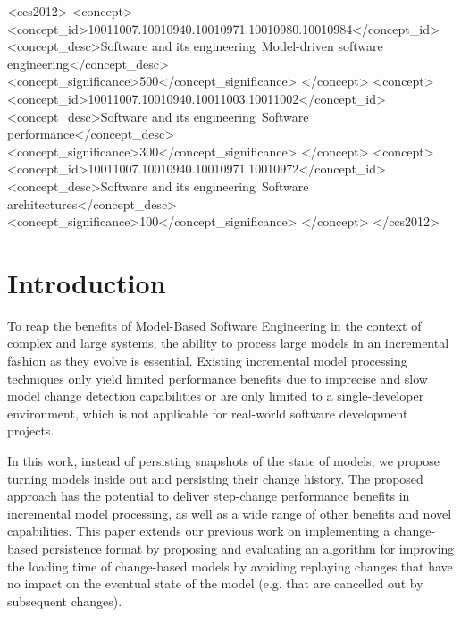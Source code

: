 \documentclass[sigconf]{acmart}
\begin{document}
%
%

\begin{CCSXML}
<ccs2012>
<concept>
<concept_id>10011007.10010940.10010971.10010980.10010984</concept_id>
<concept_desc>Software and its engineering~Model-driven software engineering</concept_desc>
<concept_significance>500</concept_significance>
</concept>
<concept>
<concept_id>10011007.10010940.10011003.10011002</concept_id>
<concept_desc>Software and its engineering~Software performance</concept_desc>
<concept_significance>300</concept_significance>
</concept>
<concept>
<concept_id>10011007.10010940.10010971.10010972</concept_id>
<concept_desc>Software and its engineering~Software architectures</concept_desc>
<concept_significance>100</concept_significance>
</concept>
</ccs2012>
\end{CCSXML}




\maketitle

\section{Introduction}
\label{sec:introduction}
To reap the benefits of Model-Based Software Engineering in the context of complex and large systems, the ability to process large models in an incremental fashion as they evolve is essential. Existing incremental model processing techniques only yield limited performance benefits due to imprecise and slow model change detection capabilities or are only limited to a single-developer environment, which is not applicable for real-world software development projects.

In this work, instead of persisting snapshots of the state of models, we propose turning models inside out and persisting their change history. The proposed approach has the potential to deliver step-change performance benefits in incremental model processing, as well as a wide range of other benefits and novel capabilities. This paper extends our previous work \cite{yohannis2017turning} on implementing a change-based persistence format by proposing and evaluating an algorithm for improving the loading time of change-based models by avoiding replaying changes that have no impact on the eventual state of the model (e.g. that are cancelled out by subsequent changes).
\end{document}
